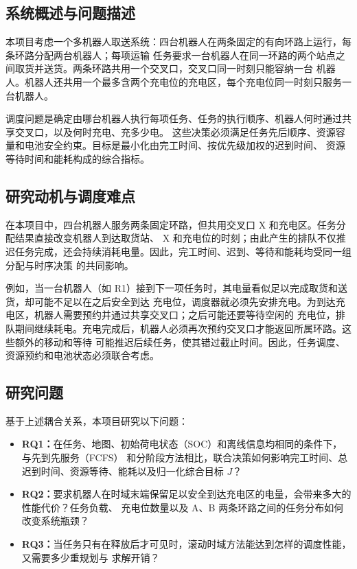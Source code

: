 \documentclass[11pt,a4paper,fontset=none]{ctexart}
\begin{document}
\subsection{系统概述与问题描述}

本项目考虑一个多机器人取送系统：四台机器人在两条固定的有向环路上运行，每条环路分配两台机器人；每项运输
任务要求一台机器人在同一环路的两个站点之间取货并送货。两条环路共用一个交叉口，交叉口同一时刻只能容纳一台
机器人。机器人还共用一个最多含两个充电位的充电区，每个充电位同一时刻只服务一台机器人。

调度问题是确定由哪台机器人执行每项任务、任务的执行顺序、机器人何时通过共享交叉口，以及何时充电、充多少电。
这些决策必须满足任务先后顺序、资源容量和电池安全约束。目标是最小化由完工时间、按优先级加权的迟到时间、
资源等待时间和能耗构成的综合指标。

\subsection{研究动机与调度难点}

在本项目中，四台机器人服务两条固定环路，但共用交叉口 X 和充电区。任务分配结果直接改变机器人到达取货站、
X 和充电位的时刻；由此产生的排队不仅推迟任务完成，还会持续消耗电量。因此，完工时间、迟到、等待和能耗均受同一组分配与时序决策
的共同影响。

例如，当一台机器人（如 R1）接到下一项任务时，其电量看似足以完成取货和送货，却可能不足以在之后安全到达
充电位，调度器就必须先安排充电。为到达充电区，机器人需要预约并通过共享交叉口；之后可能还要等待空闲的
充电位，排队期间继续耗电。充电完成后，机器人必须再次预约交叉口才能返回所属环路。这些额外的移动和等待
可能推迟后续任务，使其错过截止时间。因此，任务调度、资源预约和电池状态必须联合考虑。

\subsection{研究问题}

基于上述耦合关系，本项目研究以下问题：
\begin{itemize}
\item \textbf{RQ1：}在任务、地图、初始荷电状态（SOC）和离线信息均相同的条件下，与先到先服务（FCFS）
  和分阶段方法相比，联合决策如何影响完工时间、总迟到时间、资源等待、能耗以及归一化综合目标 $J$？
\item \textbf{RQ2：}要求机器人在时域末端保留足以安全到达充电区的电量，会带来多大的性能代价？任务负载、
  充电位数量以及 A、B 两条环路之间的任务分布如何改变系统瓶颈？
\item \textbf{RQ3：}当任务只有在释放后才可见时，滚动时域方法能达到怎样的调度性能，又需要多少重规划与
  求解开销？
\end{itemize}
\end{document}
